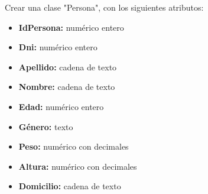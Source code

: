 
Crear una clase "Persona", con los siguientes atributos:
\begin{itemize}[itemsep=0.2em]
    \item \textbf{IdPersona:} num\'erico entero
    \item \textbf{Dni:} num\'erico entero
    \item \textbf{Apellido:} cadena de texto
    \item \textbf{Nombre:} cadena de texto
    \item \textbf{Edad:} num\'erico entero
    \item \textbf{G\'enero:} texto
    \item \textbf{Peso:} num\'erico con decimales
    \item \textbf{Altura:} num\'erico con decimales
    \item \textbf{Domicilio:} cadena de texto
\end{itemize}


\volverindice
\newpage